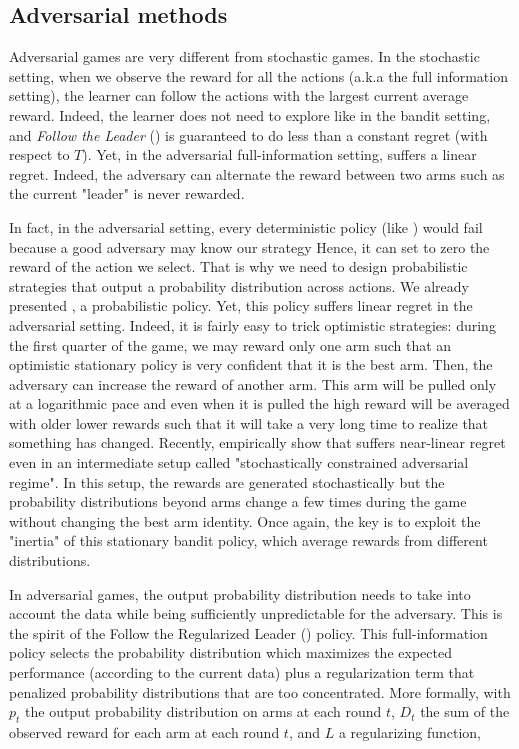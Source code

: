 {\subsection{Adversarial methods}

Adversarial games are very different from stochastic games. In the stochastic setting, when we observe the reward for all the actions (a.k.a the full information setting), the learner can follow the actions with the largest current average reward. Indeed, the learner does not need to explore like in the bandit setting, and \emph{Follow the Leader} (\FTL) is guaranteed to do less than a constant regret (with respect to $T$). Yet, in the adversarial full-information setting, \FTL suffers a linear regret. Indeed, the adversary can alternate the reward between two arms such as the current "leader" is never rewarded. 

In fact, in the adversarial setting, every deterministic policy (like \UCB) would fail because a good adversary may know our strategy Hence, it can set to zero the reward of the action we select. That is why we need to design probabilistic strategies that output a probability distribution across actions. We already presented \TS, a probabilistic policy. Yet, this policy suffers linear regret in the adversarial setting. Indeed, it is fairly easy to trick optimistic strategies: during the first quarter of the game, we may reward only one arm such that an optimistic stationary policy is very confident that it is the best arm. Then, the adversary can increase the reward of another arm. This arm will be pulled only at a logarithmic pace and even when it is pulled the high reward will be averaged with older lower rewards such that it will take a very long time to realize that something has changed. Recently, \citet{zimmert2018tsallis} empirically show that \TS suffers near-linear regret even in an intermediate setup called "stochastically constrained adversarial regime". In this setup, the rewards are generated stochastically but the probability distributions beyond arms change a few times during the game without changing the best arm identity. Once again, the key is to exploit the "inertia" of this stationary bandit policy, which average rewards from different distributions.

In adversarial games, the output probability distribution needs to take into account the data while being sufficiently unpredictable for the adversary. This is the spirit of the Follow the Regularized Leader (\FTRL) policy. This full-information policy selects the probability distribution which maximizes the expected performance (according to the current data) plus a regularization term that penalized probability distributions that are too concentrated. More formally, with $p_t$ the output probability distribution on arms at each round $t$, $D_t$ the sum of the observed reward for each arm at each round $t$, and $L$ a regularizing function,

}
